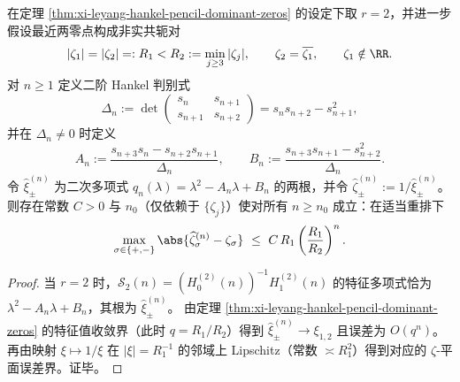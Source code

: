 \begin{corollary}\label{cor:xi-leyang-nearest-conjugate-pair-discriminant-estimator}
在定理 \ref{thm:xi-leyang-hankel-pencil-dominant-zeros} 的设定下取 \(r=2\)，并进一步假设最近两零点构成非实共轭对
\[
|\zeta_1|=|\zeta_2|=:R_1<R_2:=\min_{j\ge 3}|\zeta_j|,\qquad \zeta_2=\overline{\zeta_1},\qquad \zeta_1\notin\RR.
\]
对 \(n\ge 1\) 定义二阶 Hankel 判别式
\[
\Delta_n:=\det\begin{pmatrix}
s_n & s_{n+1}\\
s_{n+1} & s_{n+2}
\end{pmatrix}
=s_ns_{n+2}-s_{n+1}^2,
\]
并在 \(\Delta_n\neq 0\) 时定义
\[
A_n:=\frac{s_{n+3}s_n-s_{n+2}s_{n+1}}{\Delta_n},\qquad
B_n:=\frac{s_{n+3}s_{n+1}-s_{n+2}^2}{\Delta_n}.
\]
令 \(\widehat\xi_\pm^{(n)}\) 为二次多项式 \(q_n(\lambda)=\lambda^2-A_n\lambda+B_n\) 的两根，并令 \(\widehat\zeta_\pm^{(n)}:=1/\widehat\xi_\pm^{(n)}\)。
则存在常数 \(C>0\) 与 \(n_0\)（仅依赖于 \(\{\zeta_j\}\)）使对所有 \(n\ge n_0\) 成立：在适当重排下
\[
\max_{\sigma\in\{+,-\}}\abs{\widehat\zeta_\sigma^{(n)}-\zeta_\sigma}
\ \le\ C\,R_1\left(\frac{R_1}{R_2}\right)^{n}.
\]
\end{corollary}
\begin{proof}
当 \(r=2\) 时，\(\mathcal{S}_2(n)=(H_0^{(2)}(n))^{-1}H_1^{(2)}(n)\) 的特征多项式恰为
\(
\lambda^2-A_n\lambda+B_n
\)，其根为 \(\widehat\xi_\pm^{(n)}\)。
由定理 \ref{thm:xi-leyang-hankel-pencil-dominant-zeros} 的特征值收敛界（此时 \(q=R_1/R_2\)）得到
\(\widehat\xi_\pm^{(n)}\to \xi_{1,2}\) 且误差为 \(O(q^n)\)。
再由映射 \(\xi\mapsto 1/\xi\) 在 \(|\xi|=R_1^{-1}\) 的邻域上 Lipschitz（常数 \(\asymp R_1^2\)）得到对应的 \(\zeta\)-平面误差界。证毕。
\end{proof}

